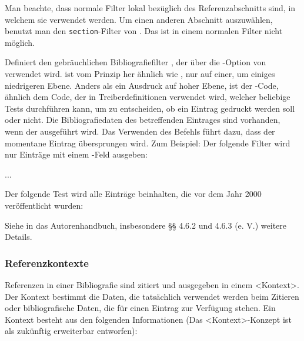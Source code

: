 \documentclass{ltxdockit}[2011/03/25]
\begin{document}
Man beachte, dass normale Filter lokal bezüglich des Referenzabschnitts sind,
in welchem sie verwendet werden. Um einen anderen Abschnitt auszuwählen,
benutzt man den \texttt{section}-Filter von . Das ist in
einem normalen Filter nicht möglich.

\begin{ltxsyntax}


Definiert den gebräuchlichen Bibliografiefilter , der über die
-Option von  verwendet wird. 
ist vom Prinzip her ähnlich wie , nur auf einer, um einiges
niedrigeren Ebene. Anders als ein Ausdruck auf hoher Ebene, ist der 
\latex-Code, ähnlich dem Code, der in Treiberdefinitionen verwendet wird,
welcher beliebige Tests durchführen kann, um zu entscheiden, ob ein Eintrag
gedruckt werden soll oder nicht. Die Bibliografiedaten des betreffenden
Eintrages sind vorhanden, wenn der  ausgeführt wird. Das Verwenden
des Befehls  führt dazu, dass der momentane Eintrag
übersprungen wird. Zum Beispiel: Der folgende Filter wird nur Einträge mit
einem -Feld ausgeben:

\begin{ltxexample}
...
\printbibliography[<<check=abstract>>]
\end{ltxexample}
%

Der folgende Test wird alle Einträge beinhalten, die vor dem Jahr 2000
veröffentlicht wurden:

\begin{ltxexample}
\end{ltxexample}
%

Siehe in das Autorenhandbuch, insbesondere §§ 4.6.2 und 4.6.3 (e. V.)
weitere Details.

\end{ltxsyntax}

\subsubsection{Referenzkontexte}
\label{use:bib:context}

Referenzen in einer Bibliografie sind zitiert und ausgegeben in einem <Kontext>.
Der Kontext bestimmt die Daten, die tatsächlich verwendet werden beim Zitieren
oder bibliografische Daten, die für einen Eintrag zur Verfügung stehen. Ein
Kontext besteht aus den folgenden Informationen (Das <Kontext>-Konzept ist als zukünftig
erweiterbar entworfen):
\end{document}
